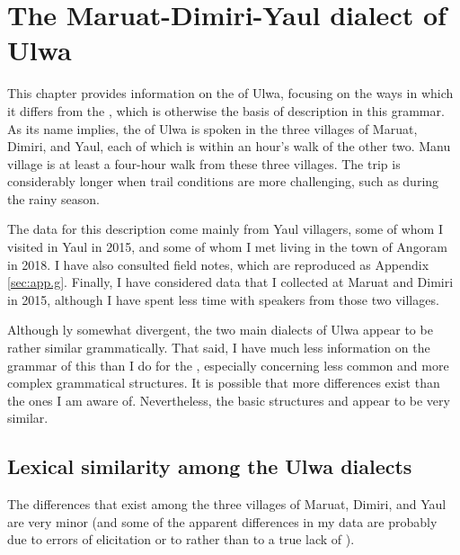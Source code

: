 \chapter{The Maruat-Dimiri-Yaul dialect of Ulwa}\label{sec:18}


This chapter provides information on the   of Ulwa, focusing on the ways in which it differs from the  , which is otherwise the basis of description in this grammar. As its name implies, the   of Ulwa is spoken in the three villages of Maruat, Dimiri, and Yaul, each of which is within an hour’s walk of the other two. Manu village is at least a four-hour walk from these three villages. The trip is considerably longer when trail conditions are more challenging, such as during the rainy season.

  The data for this description come mainly from Yaul villagers, some of whom I visited in Yaul in 2015, and some of whom I met living in the town of Angoram in 2018. I have also consulted  field notes, which are reproduced as Appendix \ref{sec:app.g}. Finally, I have considered data that I collected at Maruat and Dimiri in 2015, although I have spent less time with speakers from those two villages.

  Although ly somewhat divergent, the two main dialects of Ulwa appear to be rather similar grammatically. That said, I have much less information on the grammar of this  than I do for the  , especially concerning less common and more complex grammatical structures. It is possible that more differences exist than the ones I am aware of. Nevertheless, the basic  structures and  appear to be very similar.


\section{\label{sec:18.1}  Lexical similarity among the Ulwa dialects}


The  differences that exist among the three villages of Maruat, Dimiri, and Yaul are very minor (and some of the apparent differences in my data are probably due to errors of elicitation or to  rather than to a true lack of ). 

